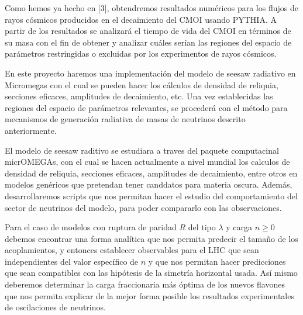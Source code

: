 Como hemos ya hecho en [3], obtendremos resultados numéricos para los flujos de rayos cósmicos  producidos en el decaimiento del CMOI usando PYTHIA. A partir de los resultados se analizará el tiempo de vida del CMOI  en términos de su masa con el fin de obtener y analizar cuáles serían las regiones del espacio de parámetros restringidas o excluidas por los experimentos de rayos cósmicos.

En este proyecto haremos una implementación del modelo de seesaw radiativo en Micromegas  con el cual se pueden hacer los cálculos de densidad de reliquia, secciones eficaces, amplitudes de decaimiento, etc. Una vez establecidas las regiones del espacio de parámetros relevantes, se procederá con el método para mecanismos de generación radiativa de masas de neutrinos descrito anteriormente.

El modelo de seesaw raditivo se estudiara a traves del paquete computacinal micrOMEGAs, con el cual se hacen actualmente a nivel mundial los calculos de densidad de reliquia, secciones eficaces, amplitudes de decaimiento, entre otros en modelos genéricos que pretendan tener canddatos para materia oscura. Además, desarrollaremos scripts que nos permitan hacer el estudio del comportamiento del sector de neutrinos del modelo, para poder compararlo con las observaciones.

Para el caso de modelos con ruptura de paridad $R$ del tipo $\lambda$ y carga $n\ge 0$ debemos encontrar una forma analítica que nos permita predecir el tamaño de los acoplamientos, y entonces establecer observables para el LHC que sean independientes del valor específico de $n$ y que nos permitan hacer predicciones que sean compatibles con las hipótesis de la simetría horizontal usada. Así mismo deberemos determinar la carga fraccionaria más óptima de los nuevos flavones que nos permita explicar de la mejor forma posible los resultados experimentales de oscilaciones de neutrinos.



